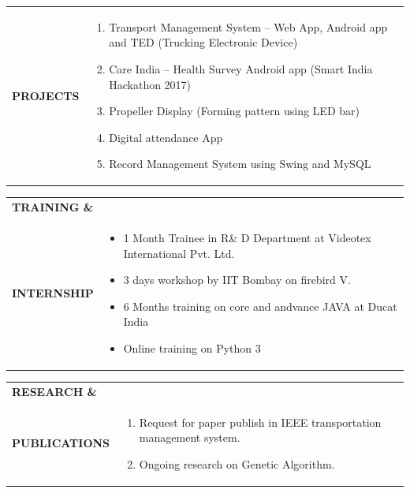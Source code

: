 \documentclass{article}
\begin{document}
\begin{table}[h!]
    \begin{tabular}{l  p{}} 
      \textbf{\Large{PROJECTS}} & 
	\begin{enumerate}
	\item Transport Management System – Web App, Android app and TED (Trucking Electronic Device)
	\item Care India – Health Survey Android app (Smart India Hackathon 2017)
	\item Propeller Display (Forming pattern using LED bar)
	\item Digital attendance App
	\item Record Management System using Swing and MySQL
   	\end{enumerate} 
    \end{tabular}
\end{table}

\begin{table}[h!]
    \begin{tabular}{l  p{}} 
      \textbf{\Large{TRAINING \&}} \\  \textbf{\Large{INTERNSHIP}}& 
	\begin{itemize}
	\item 1 Month Trainee in R\& D Department at Videotex International Pvt. Ltd.
	\item 3 days workshop by IIT Bombay on firebird V.
	\item 6 Months training on core and andvance JAVA at Ducat India
	\item Online training on Python 3
   	\end{itemize} 
    \end{tabular}
\end{table}

\begin{table}[h!]
    \begin{tabular}{l  p{}} 
      \textbf{\Large{RESEARCH \&}} \\  \textbf{\Large{PUBLICATIONS}}& 
	\begin{enumerate}
	\item Request for paper publish in IEEE transportation management system.
	\item Ongoing research on Genetic Algorithm.
   	\end{enumerate} 
    \end{tabular}
\end{table}
\end{document}
